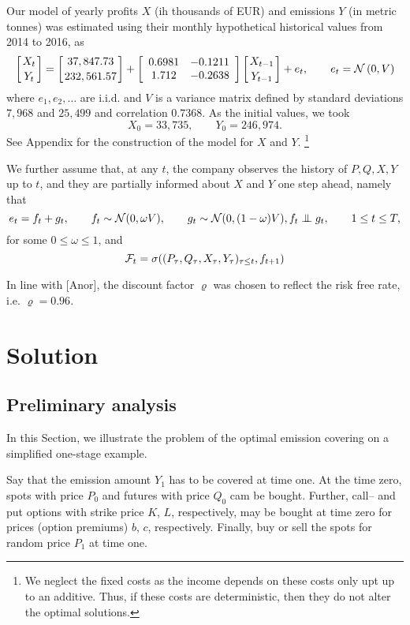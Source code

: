 \documentclass[3p,times]{elsarticle}
\begin{document}
Our model of yearly profits $X$ (ih thousands of EUR) and emissions $Y$ (in metric tonnes) was estimated using their monthly hypothetical historical values from 2014 to 2016, as 
\begin{equation}
\left[X_t
\atop
Y_t
\right]
=\left[37,847.73
\atop
232,561.57
\right]+
\left[
\begin{array}{cc}
0.6981 & -0.1211 \\
1.712 & -0.2638
\end{array}
\right]
\left[X_{t-1}
\atop
Y_{t-1}
\right]
 + e_t,\qquad e_t = \mathcal{N}\left(0,V\right)  
\end{equation}
where $e_1,e_2,\dots$ are i.i.d. and $V$ is a variance matrix defined by standard deviations $7,968$ and $25,499$ and correlation $0.7368$. As the initial values, we took
$$
X_0 = 33,735,\qquad Y_0 = 246,974.
$$
See Appendix for the construction of the model for $X$ and $Y$. \footnote{We neglect the fixed costs as the income depends on these costs only upt up to an additive. Thus, if these costs are deterministic, then they do not alter the optimal solutions.}



We further assume that, at any $t$, the company observes the history of $P,Q,X,Y$ up to $t$, and they are  partially informed about $X$ and $Y$ one step ahead, namely that 
$$
e_t = f_t+g_t, \qquad f_t \sim \mathcal{N}(0,\omega V), 
\qquad
g_t \sim \mathcal{N}(0,(1-\omega) V),f_t \indep g_t,\qquad 1 \leq t \leq T,
$$
for some $0\leq \omega \leq 1$, and
$$
\mathcal{F}_t = \sigma( (P_\tau,Q_\tau,X_\tau,Y_\tau)_{\tau \leq t}, f_{t+1} )
$$

In line with [Anor], the discount factor $\varrho$ was chosen to reflect the risk free rate, i.e. $\varrho=0.96$.
		
\section{Solution}

\subsection*{Preliminary analysis}

In this Section, we illustrate the problem of the optimal emission covering on a simplified one-stage example. 

Say that the emission amount $Y_1$ has to be covered at time one. At the time zero, spots with price $P_0$ and futures with price $Q_0$ cam be bought.  Further, call-- and put options with strike price $K$, $L$, respectively, may be bought at time zero for prices (option premiums) $b$, $c$, respectively. Finally, buy or sell the spots for random price $P_1$ at time one.
\end{document}

